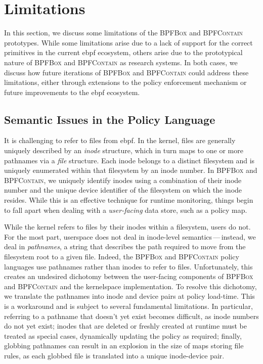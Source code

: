 \documentclass[
  fontsize=12pt,
  titlepage=firstiscover,
  paper=letter,
oneside,
  cleardoublepage=plain,
  parskip=half-,
  DIV=10,
  parindent,
  appendixprefix,
  chapterprefix,
  listof=totoc,
]{scrbook}
\newcommand{\bpfbox}{\textsc{BPFBox}}
\newcommand{\bpfcontain}{\textsc{BPFContain}}
\begin{document}
\section{Limitations}\label{s:disc-limitations}

In this section, we discuss some limitations of the \bpfbox{} and \bpfcontain{}
prototypes. While some limitations arise due to a lack of support for the correct
primitives in the current \gls{ebpf} ecosystem, others arise due to the prototypical
nature of \bpfbox{} and \bpfcontain{} as research systems. In both cases, we discuss how
future iterations of \bpfbox{} and \bpfcontain{} could address these limitations, either
through extensions to the policy enforcement mechanism or future improvements to the
\gls{ebpf} ecosystem.

\subsection{Semantic Issues in the Policy Language}\label{ss:disc-semantic-issues}

It is challenging to refer to files from \gls{ebpf}. In the kernel, files are generally uniquely
described by an \textit{inode} structure, which in turn maps to one or more pathnames via
a \textit{file} structure. Each inode belongs to a distinct filesystem and is uniquely
enumerated within that filesystem by an inode number.  In \bpfbox{} and \bpfcontain{}, we
uniquely identify inodes using a combination of their inode number and the unique device
identifier of the filesystem on which the inode resides. While this is an effective
technique for runtime monitoring, things begin to fall apart when dealing with
a \textit{user-facing} data store, such as a policy map.

While the kernel refers to files by their inodes within a filesystem, users do not. For
the most part, userspace does not deal in inode-level semantics\,---\,instead, we deal in
\textit{pathnames}, a string that describes the path required to move from the filesystem
root to a given file. Indeed, the \bpfbox{} and \bpfcontain{} policy languages use
pathnames rather than inodes to refer to files. Unfortunately, this creates an undesired
dichotomy between the user-facing components of \bpfbox{} and \bpfcontain{} and the
kernelspace implementation.  To resolve this dichotomy, we translate the pathnames into
inode and device pairs at policy load-time. This is a workaround and is subject to several
fundamental limitations. In particular, referring to a pathname that doesn't yet exist
becomes difficult, as inode numbers do not yet exist; inodes that are deleted or freshly
created at runtime must be treated as special cases, dynamically updating the policy as
required; finally, globbing pathnames can result in an explosion in the size of maps
storing file rules, as each globbed file is translated into a unique inode-device pair.
\end{document}
